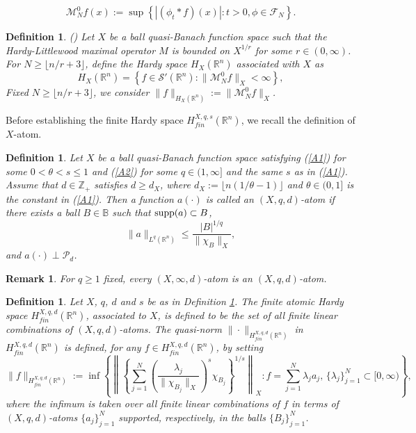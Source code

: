 \documentclass[oneside,10pt]{article}
\newtheorem{definition}[theorem]{Definition}
\newtheorem{remark}[theorem]{Remark}
\newcommand\supp{\mathop{\rm supp}}
\begin{document}
\begin{equation} \label{grand max 0}
\mathcal{M}^{0}_{N} f(x) :=\sup \left\{ |\left( \phi_t \ast f\right)(x) | : t > 0, \phi \in \mathcal{F}_{N} \right\}.
\end{equation}

\begin{definition} (\cite[Theorem 3.1 - (ii) with $b = n/r + 1$]{sawa})
Let $X$ be a ball quasi-Banach function space such that the Hardy-Littlewood maximal operator $M$ is bounded on $X^{1/r}$ for some 
$r \in (0, \infty)$. For $N \geq \lfloor  n/r + 3 \rfloor$, define the Hardy space $H_{X}(\mathbb{R}^n)$ associated with $X$ as
\begin{equation}  \label{Hx def}
H_{X}(\mathbb{R}^n) = \left\{ f \in \mathcal{S}'(\mathbb{R}^n) : \| \mathcal{M}^{0}_{N} f \|_{X} < \infty \right\},
\end{equation}
Fixed  $N \geq \lfloor  n/r + 3 \rfloor$, we consider  $\| f \|_{H_{X}(\mathbb{R}^n)} := \| \mathcal{M}^{0}_{N} f \|_{X}$.
\end{definition}

Before establishing the finite Hardy space $H^{X, q, s}_{fin}(\mathbb{R}^n)$, we recall the definition of $X$-atom.

\begin{definition} \label{atom}
Let $X$ be a ball quasi-Banach function space satisfying (\ref{A1}) for some $0 < \theta < s \leq 1$ and (\ref{A2}) for some 
$q \in (1, \infty]$ and the same $s$ as in (\ref{A1}). Assume that $d \in \mathbb{Z}_{+}$ satisfies 
$d \geq d_X$, where $d_X := \lfloor n (1/\theta - 1) \rfloor$ and $\theta \in (0, 1]$ is the constant in (\ref{A1}). Then a function 
$a(\cdot)$ is called an $(X, q, d)$-atom if there exists a ball $B \in \mathbb{B}$ such that $\supp(a) \subset B$,
\[
\| a \|_{L^q(\mathbb{R}^n)} \leq \frac{|B|^{1/q}}{\| \chi_B \|_{X}},
\]
and $a(\cdot) \perp \mathcal{P}_d$.
\end{definition}

\begin{remark} \label{infinite atom}
For $q \geq 1$ fixed, every $(X, \infty, d)$-atom is an $(X, q, d)$-atom.
\end{remark}


\begin{definition}
Let $X$, $q$, $d$ and $s$ be as in Definition \ref{atom}. The finite atomic Hardy space $H^{X, q, d}_{fin}(\mathbb{R}^n)$, 
associated to $X$, is defined to be the set of all finite linear combinations of $(X, q, d)$-atoms. The quasi-norm 
$\| \cdot \|_{H^{X, q, d}_{fin}(\mathbb{R}^n)}$ in $H^{X, q, d}_{fin}(\mathbb{R}^n)$ is defined, for any 
$f \in H^{X, q, d}_{fin}(\mathbb{R}^n)$, by setting
\[
\| f \|_{H^{X, q, d}_{fin}(\mathbb{R}^n)} := \inf \left\{ \left\| \left\{ \sum_{j=1}^{N} \left( \frac{\lambda_j}{\| \chi_{B_j} \|_X} 
\right)^{s} \chi_{B_j} \right\}^{1/s} \right\|_X : f = \sum_{j=1}^{N} \lambda_j a_{j}, \, \{ \lambda_j \}_{j=1}^{N} \subset [0, \infty) \right\},
\]
where the infimum is taken over all finite linear combinations of $f$ in terms of $(X, q, d)$-atoms $\{ a_j \}_{j=1}^{N}$ supported, respectively, in the balls $\{ B_j \}_{j=1}^{N}$.
\end{definition}
\end{document}
